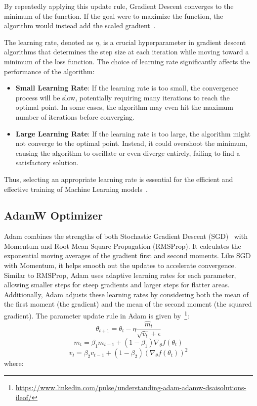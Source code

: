 \documentclass[12pt,a4paper]{report}
\begin{document}
By repeatedly applying this update rule, Gradient Descent converges to the minimum of the function. If the goal were to maximize the function, the algorithm would instead add the scaled gradient~\cite{gradientdescent}.

The learning rate, denoted as \(\eta\), is a crucial hyperparameter in gradient descent algorithms that determines the step size at each iteration while moving toward a minimum of the loss function. The choice of learning rate significantly affects the performance of the algorithm:

\begin{itemize}
  \item \textbf{Small Learning Rate}: If the learning rate is too small, the convergence process will be slow, potentially requiring many iterations to reach the optimal point. In some cases, the algorithm may even hit the maximum number of iterations before converging.
  \item \textbf{Large Learning Rate}: If the learning rate is too large, the algorithm might not converge to the optimal point. Instead, it could overshoot the minimum, causing the algorithm to oscillate or even diverge entirely, failing to find a satisfactory solution.
\end{itemize}

Thus, selecting an appropriate learning rate is essential for the efficient and effective training of Machine Learning models~\cite{gradientdescent}.

\subsection{AdamW Optimizer}

Adam combines the strengths of both Stochastic Gradient Descent (SGD)~\cite{bottou2012stochastic} with Momentum and Root Mean Square Propagation (RMSProp). It calculates the exponential moving averages of the gradient first and second moments. Like SGD with Momentum, it helps smooth out the updates to accelerate convergence. Similar to RMSProp, Adam uses adaptive learning rates for each parameter, allowing smaller steps for steep gradients and larger steps for flatter areas. Additionally, Adam adjusts these learning rates by considering both the mean of the first moment (the gradient) and the mean of the second moment (the squared gradient). The parameter update rule in Adam is given by~\footnote{\url{https://www.linkedin.com/pulse/understanding-adam-adamw-dsaisolutions-ileof/}}:
\begin{equation}
  \theta_{t+1} = \theta_t - \eta \frac{\hat{m}_t}{\sqrt{\hat{v}_t} + \epsilon}
\end{equation}
\begin{equation}
  m_t = \beta_1 m_{t-1} + (1 - \beta_1) \nabla_\theta f(\theta_t)
\end{equation}
\begin{equation}
  v_t = \beta_2 v_{t-1} + (1 - \beta_2) (\nabla_\theta f(\theta_t))^2
\end{equation}
where:
\end{document}
